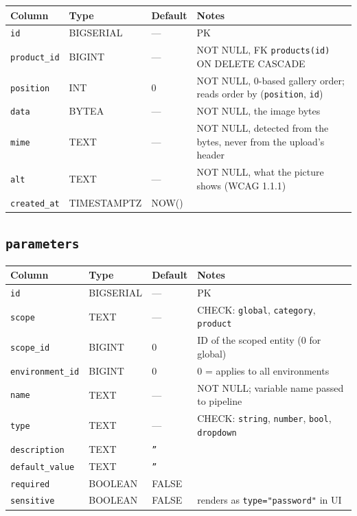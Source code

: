 \documentclass[12pt,a4paper,twoside]{report}
\newcommand{\code}[1]{\texttt{#1}}
\begin{document}
\begin{table}[H]
  \centering\small
  \begin{tabular}{@{}llll@{}}
    \toprule
    \textbf{Column} & \textbf{Type} & \textbf{Default} & \textbf{Notes} \\
    \midrule
    \code{id}         & BIGSERIAL & ---  & PK \\
    \code{product\_id}& BIGINT    & ---  & NOT NULL, FK \textrightarrow{} \code{products(id)} ON DELETE CASCADE \\
    \code{position}   & INT       & 0    & NOT NULL, 0-based gallery order; reads order by (\code{position}, \code{id}) \\
    \code{data}       & BYTEA     & ---  & NOT NULL, the image bytes \\
    \code{mime}       & TEXT      & ---  & NOT NULL, detected from the bytes, never from the upload's header \\
    \code{alt}        & TEXT      & ---  & NOT NULL, what the picture shows (WCAG 1.1.1) \\
    \code{created\_at}& TIMESTAMPTZ & NOW() & \\
    \bottomrule
  \end{tabular}
\end{table}

\subsection*{\texttt{parameters}}

\begin{table}[H]
  \centering\small
  \begin{tabular}{@{}llll@{}}
    \toprule
    \textbf{Column} & \textbf{Type} & \textbf{Default} & \textbf{Notes} \\
    \midrule
    \code{id}             & BIGSERIAL & --- & PK \\
    \code{scope}          & TEXT      & --- & CHECK: \code{global}, \code{category}, \code{product} \\
    \code{scope\_id}      & BIGINT    & 0   & ID of the scoped entity (0 for global) \\
    \code{environment\_id}& BIGINT    & 0   & 0 = applies to all environments \\
    \code{name}           & TEXT      & --- & NOT NULL; variable name passed to pipeline \\
    \code{type}           & TEXT      & --- & CHECK: \code{string}, \code{number}, \code{bool}, \code{dropdown} \\
    \code{description}    & TEXT      & \code{''} & \\
    \code{default\_value} & TEXT      & \code{''} & \\
    \code{required}       & BOOLEAN   & FALSE & \\
    \code{sensitive}      & BOOLEAN   & FALSE & renders as \code{type="password"} in UI \\
    \bottomrule
  \end{tabular}
\end{table}
\end{document}
